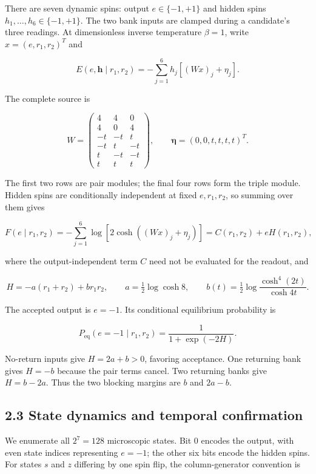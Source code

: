 \documentclass[
  11pt,
]{article}
\begin{document}
There are seven dynamic spins: output \(e\in\{-1,+1\}\) and hidden spins
\(h_1,\ldots,h_6\in\{-1,+1\}\). The two bank inputs are clamped during a
candidate's three readings. At dimensionless inverse temperature
\(\beta=1\), write \(x=(e,r_1,r_2)^T\) and

\[
E(e,\mathbf h\mid r_1,r_2)=-\sum_{j=1}^{6}h_j[(Wx)_j+\eta_j]. \tag{1}
\]

The complete source is

\[
W=\begin{pmatrix}
4&4&0\\4&0&4\\-t&-t&t\\-t&t&-t\\t&-t&-t\\t&t&t
\end{pmatrix},\qquad
\boldsymbol\eta=(0,0,t,t,t,t)^T. \tag{2}
\]

The first two rows are pair modules; the final four rows form the triple
module. Hidden spins are conditionally independent at fixed
\(e,r_1,r_2\), so summing over them gives

\[
F(e\mid r_1,r_2)=-\sum_{j=1}^{6}\log[2\cosh((Wx)_j+\eta_j)]
=C(r_1,r_2)+eH(r_1,r_2), \tag{3}
\]

where the output-independent term \(C\) need not be evaluated for the
readout, and

\[
H=-a(r_1+r_2)+br_1r_2,\qquad
a=\tfrac12\log\cosh8,\qquad
b(t)=\tfrac12\log\frac{\cosh^4(2t)}{\cosh4t}. \tag{4}
\]

The accepted output is \(e=-1\). Its conditional equilibrium probability
is

\[
P_{\mathrm{eq}}(e=-1\mid r_1,r_2)=\frac{1}{1+\exp(-2H)}. \tag{5}
\]

No-return inputs give \(H=2a+b>0\), favoring acceptance. One returning
bank gives \(H=-b\) because the pair terms cancel. Two returning banks
give \(H=b-2a\). Thus the two blocking margins are \(b\) and \(2a-b\).

\subsection{2.3 State dynamics and temporal
confirmation}\label{state-dynamics-and-temporal-confirmation}

We enumerate all \(2^7=128\) microscopic states. Bit 0 encodes the
output, with even state indices representing \(e=-1\); the other six
bits encode the hidden spins. For states \(s\) and \(z\) differing by
one spin flip, the column-generator convention is
\end{document}
